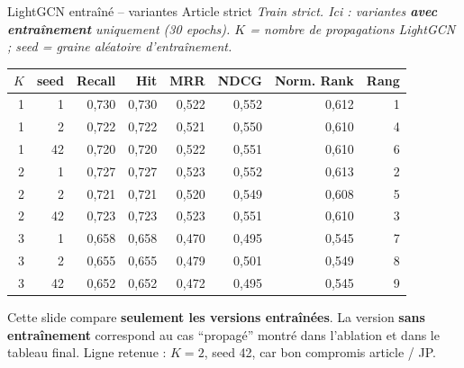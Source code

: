 \documentclass[aspectratio=169,10pt]{beamer}
\newcommand{\keybox}[1]{%
  \begin{center}
  \colorbox{accentsoft}{\parbox{0.92\linewidth}{\centering #1}}
  \end{center}}
\begin{document}
\begin{frame}{LightGCN entraîné -- variantes Article strict}
  \scriptsize
  \textit{Train strict. Ici : variantes \textbf{avec entraînement} uniquement (30 epochs). $K$ = nombre de propagations LightGCN ; seed = graine aléatoire d'entraînement.}

  \vspace{0.25em}
  \begin{center}
  \renewcommand{\arraystretch}{1.08}
  \setlength{\tabcolsep}{4pt}
  \begin{tabular}{@{}r r r r r r r r@{}}
    \toprule
    $K$ & seed & Recall & Hit & MRR & NDCG & Norm. Rank & Rang \\
    \midrule
    1 & 1 & 0,730 & 0,730 & 0,522 & 0,552 & 0,612 & 1 \\
    1 & 2 & 0,722 & 0,722 & 0,521 & 0,550 & 0,610 & 4 \\
    1 & 42 & 0,720 & 0,720 & 0,522 & 0,551 & 0,610 & 6 \\
    2 & 1 & 0,727 & 0,727 & 0,523 & 0,552 & 0,613 & 2 \\
    2 & 2 & 0,721 & 0,721 & 0,520 & 0,549 & 0,608 & 5 \\
    \rowcolor{green!10}
    2 & 42 & 0,723 & 0,723 & 0,523 & 0,551 & 0,610 & 3 \\
    3 & 1 & 0,658 & 0,658 & 0,470 & 0,495 & 0,545 & 7 \\
    3 & 2 & 0,655 & 0,655 & 0,479 & 0,501 & 0,549 & 8 \\
    3 & 42 & 0,652 & 0,652 & 0,472 & 0,495 & 0,545 & 9 \\
    \bottomrule
  \end{tabular}
  \end{center}

  \vspace{0.4em}
  \keybox{\scriptsize Cette slide compare \textbf{seulement les versions entraînées}.
  La version \textbf{sans entraînement} correspond au cas ``propagé'' montré dans l'ablation et dans le tableau final.
  Ligne retenue : $K=2$, seed 42, car bon compromis article / JP.}
\end{frame}
\end{document}
